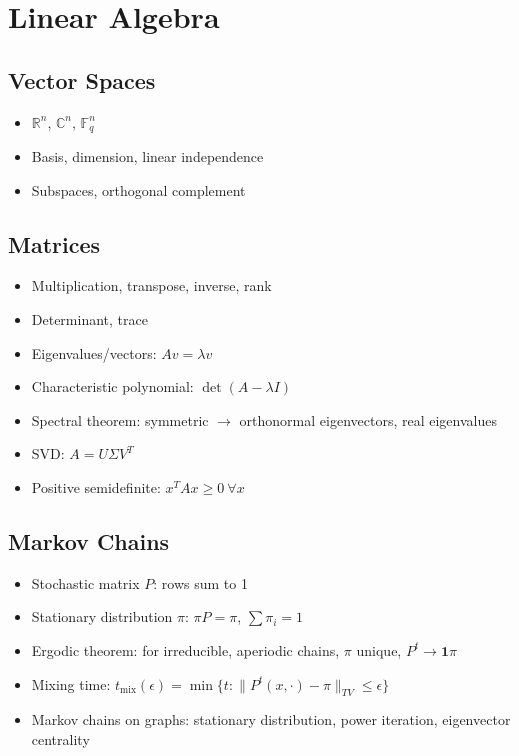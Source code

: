 \section{Linear Algebra}

\subsection{Vector Spaces}
\begin{itemize}
\item $\mathbb{R}^n$, $\mathbb{C}^n$, $\mathbb{F}_q^n$
\item Basis, dimension, linear independence
\item Subspaces, orthogonal complement
\end{itemize}

\subsection{Matrices}
\begin{itemize}
\item Multiplication, transpose, inverse, rank
\item Determinant, trace
\item Eigenvalues/vectors: $Av = \lambda v$
\item Characteristic polynomial: $\det(A - \lambda I)$
\item Spectral theorem: symmetric $\to$ orthonormal eigenvectors, real eigenvalues
\item SVD: $A = U \Sigma V^T$
\item Positive semidefinite: $x^T A x \ge 0 \ \forall x$
\end{itemize}

\subsection{Markov Chains}
\begin{itemize}
\item Stochastic matrix $P$: rows sum to 1
\item Stationary distribution $\pi$: $\pi P = \pi$, $\sum \pi_i = 1$
\item Ergodic theorem: for irreducible, aperiodic chains, $\pi$ unique, $P^t \to \mathbf{1}\pi$
\item Mixing time: $t_{\text{mix}}(\epsilon) = \min\{t : \|P^t(x,\cdot) - \pi\|_{TV} \le \epsilon\}$
\item Markov chains on graphs: stationary distribution, power iteration, eigenvector centrality
\end{itemize}

